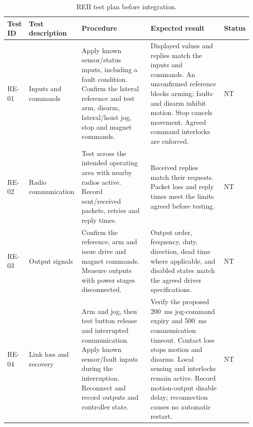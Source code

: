 \begin{table}[H]
    \centering
    \footnotesize
    \caption{REII test plan before integration.}
    \label{tab:reii-tests}
    \renewcommand{\arraystretch}{1.15}
    \setlength{\tabcolsep}{4pt}

    \begin{tabularx}{\textwidth}{|
        >{\raggedright\arraybackslash}p{1.2cm}|
        >{\raggedright\arraybackslash}p{1.9cm}|
        >{\raggedright\arraybackslash}X|
        >{\raggedright\arraybackslash}X|
        >{\centering\arraybackslash}p{1.2cm}|
    }
        \hline
        \textbf{Test ID} &
        \textbf{Test description} &
        \textbf{Procedure} &
        \textbf{Expected result} &
        \textbf{Status} \\
        \hline

        RE-01 &
        Inputs and commands &
        Apply known sensor/status inputs, including a fault
        condition. Confirm the lateral reference and test
        arm, disarm, lateral/hoist jog, stop and magnet
        commands. &
        Displayed values and replies match the inputs and
        commands. An unconfirmed reference blocks arming;
        faults and disarm inhibit motion. Stop cancels
        movement. Agreed command interlocks are enforced. &
        NT \\
        \hline

        RE-02 &
        Radio communication &
        Test across the intended operating area with nearby
        radios active. Record sent/received packets,
        retries and reply times. &
        Received replies match their requests. Packet loss
        and reply times meet the limits agreed before
        testing. &
        NT \\
        \hline

        RE-03 &
        Output signals &
        Confirm the reference, arm and issue drive and
        magnet commands. Measure outputs with power
        stages disconnected. &
        Output order, frequency, duty, direction, dead time
        where applicable, and disabled states match the
        agreed driver specifications. &
        NT \\
        \hline

        RE-04 &
        Link loss and recovery &
        Arm and jog, then test button release and interrupted
        communication. Apply known sensor/fault inputs
        during the interruption. Reconnect and record
        outputs and controller state. &
        Verify the proposed 200~ms jog-command expiry and
        500~ms communication timeout. Contact loss stops
        motion and disarms. Local sensing and interlocks
        remain active. Record motion-output disable delay;
        reconnection causes no automatic restart. &
        NT \\
        \hline


\end{tabularx}
\end{table}
